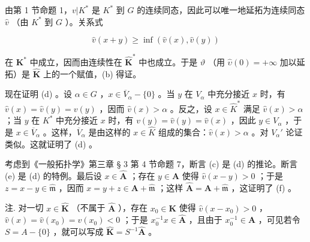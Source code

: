 由第 1 节命题 1，\(v|K^*\) 是 \(K^*\) 到 \(G\) 的连续同态，因此可以唯一地延拓为连续同态 \(\hat{v}\) （由 \(K^*\) 到 \(G\) ）。关系式

\[
\hat {v} (x + y) \geqslant \inf (\hat {v} (x), \hat {v} (y))
\]

在 \(\mathbf{K}^*\) 中成立，因而由连续性在 \(\hat{\mathbf{K}}^*\) 中也成立。于是 \(\vartheta\) （用 \(\hat{\upsilon}(0) = +\infty\) 加以延拓）是 \(\hat{\mathbf{K}}\) 上的一个赋值，(b) 得证。

现在证明 (d) 。设 \(\alpha \in G\) ，\(x \in \overline{V}_{\alpha} - \{0\}\) 。当 \(y\) 在 \(V_{\alpha}\) 中充分接近 \(x\) 时，有 \(\hat{v}(x) = \hat{v}(y) = v(y)\) ，因而 \(\hat{v}(x) > \alpha\) 。反之，设 \(x \in \widehat{K}^*\) 满足 \(\hat{v}(x) > \alpha\) ；当 \(y\) 在 \(K^*\) 中充分接近 \(x\) 时，有 \(v(y) = \hat{v}(y) = \hat{v}(x)\) ，因此 \(y \in V_{\alpha}\) ，于是 \(x \in \overline{V}_{\alpha}\) 。这样，\(\overline{V}_{\alpha}\) 是由这样的 \(x \in \widehat{K}\) 组成的集合：\(\hat{v}(x) > \alpha\) 。对 \(V_{\alpha}'\) 论证类似。这就证明了 (d) 。

考虑到《一般拓扑学》第三章 § 3 第 4 节命题 7，断言 (c) 是 (d) 的推论。断言 (e) 是 (d) 的特例。最后设 \(x \in \hat{\mathbf{A}}\) ；存在 \(y \in \mathbf{A}\) 使得 \(\hat{v}(x - y) > 0\) ；于是 \(z = x - y \in \hat{\mathfrak{m}}\) ，因而 \(x = y + z \in \mathbf{A} + \hat{\mathfrak{m}}\) ；这样 \(\hat{\mathbf{A}} = \mathbf{A} + \hat{\mathfrak{m}}\) ，这证明了 (f) 。

注. 对一切 \(x \in \hat{\mathbf{K}}\) （不属于 \(\hat{\mathbf{A}}\) ），存在 \(x_0 \in \mathbf{K}\) 使得 \(\hat{v}(x - x_0) > 0\) ，\(\hat{v}(x) = \hat{v}(x_0) = v(x_0) < 0\) ；于是 \(x_0^{-1}x \in \hat{\mathbf{A}}\) ，且由于 \(x_0^{-1} \in \mathbf{A}\) ，可见若令 \(S = A - \{0\}\) ，就可以写成 \(\hat{\mathbf{K}} = S^{-1}\hat{\mathbf{A}}\) 。

